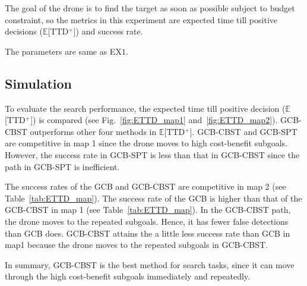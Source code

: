 The goal of the drone is to find the target as soon as possible subject to budget constraint, so the metrics in this experiment are expected time till positive decisions ($\mathbb{E}$[TTD$^+$]) and success rate.

The parameters are same as EX$1$.

\subsection{Simulation}
To evaluate the search performance, the expected time till positive decision ($\mathbb{E}$[TTD$^+$]) is compared (see Fig.~\ref{fig:ETTD_map1} and~\ref{fig:ETTD_map2}).
GCB-CBST outperforms other four methods in $\mathbb{E}$[TTD$^+$].
GCB-CBST and GCB-SPT are competitive in map 1 since the drone moves to high cost-benefit subgoals.
However, the success rate in GCB-SPT is less than that in GCB-CBST since the path in GCB-SPT is inefficient.
%


The success rates of the GCB and GCB-CBST are competitive in map 2 (see Table~\ref{tab:ETTD_map}).
The success rate of the GCB is higher than that of the GCB-CBST in map 1 (see Table~\ref{tab:ETTD_map}).
In the GCB-CBST path, the drone moves to the repeated subgoals. Hence, it has fewer false detections than GCB does.
GCB-CBST attains the a little less success rate than GCB in map1 because the drone moves to the repeated subgoals in GCB-CBST.

In summary, GCB-CBST is the best method for search tasks, since it can move through the high cost-benefit subgoals immediately and repeatedly.



